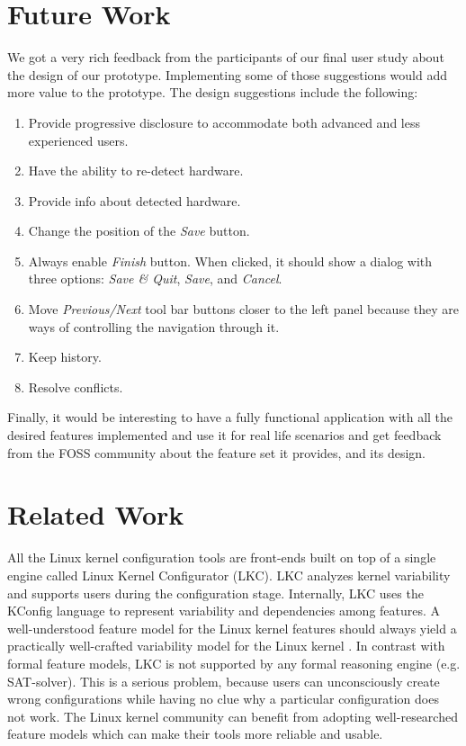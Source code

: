 \documentclass{chi2009}
\begin{document}
\section{Future Work}\label{sec:futurework}
We got a very rich feedback from the participants of our final user study about the design of our prototype. Implementing some of those suggestions would add
more value to the prototype. The design suggestions include the following:
\begin{enumerate}
 \item Provide progressive disclosure to accommodate both advanced and less experienced users.
 \item Have the ability to re-detect hardware.
 \item Provide info about detected hardware.
 \item Change the position of the \textit{Save} button.
 \item Always enable \textit{Finish} button. When clicked, it should show a dialog with three options: \textit{Save \& Quit}, \textit{Save}, and
\textit{Cancel}.
 \item Move \textit{Previous/Next} tool bar buttons closer to the left panel because they are ways of controlling the navigation through it.
 \item Keep history.
 \item Resolve conflicts.
\end{enumerate}

Finally, it would be interesting to have a fully functional application with all the desired features implemented and use it for real life scenarios and get
feedback from the FOSS community about the feature set it provides, and its design.

\section{Related Work}\label{sec:relatedwork}

All the Linux kernel configuration tools are front-ends built on top of a single engine called Linux Kernel Configurator (LKC). LKC analyzes kernel variability
and supports users during the configuration stage. Internally, LKC uses the KConfig language to represent variability and dependencies among features.
A well-understood feature model for the Linux kernel features should always yield a practically well-crafted variability model for the Linux kernel
\cite{sincero:lkc:2008,she:kernel:2010}. In contrast with formal feature models, LKC is not supported by any formal reasoning engine (e.g. SAT-solver). This is
a serious problem, because users can unconsciously create wrong configurations while having no clue why a particular configuration does not work. The Linux
kernel community can benefit from adopting well-researched feature models which can make their tools more reliable and usable.
\end{document}
